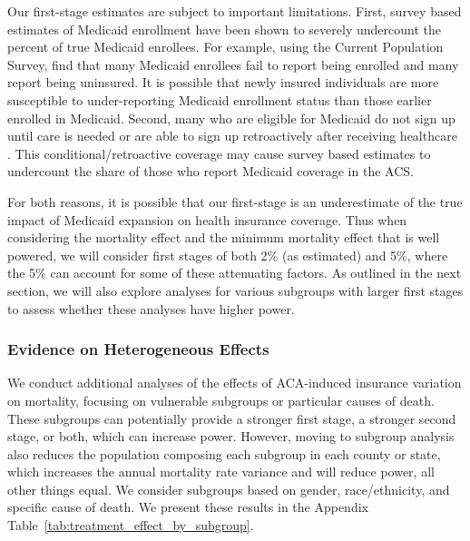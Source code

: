 \documentclass[12pt]{article}%
\begin{document}
   Our first-stage estimates are subject to important limitations. 
  First, survey based estimates of Medicaid enrollment have been shown to severely undercount the percent of true Medicaid enrollees. 
  For example, using the Current Population Survey, \citet{Davern2009MedicaidUndercountInSurveys} find that many Medicaid enrollees fail to report being enrolled and many report being  uninsured. 
  It is possible that newly insured individuals are more susceptible to under-reporting Medicaid enrollment status than those earlier enrolled in Medicaid. 
  Second, many who are eligible for Medicaid do not sign up until care is needed or are able to sign up retroactively after receiving healthcare \citep{martonHealthInsuranceGenerosity2015}. 
  This conditional/retroactive coverage may cause survey based estimates to undercount the share of those who report Medicaid coverage in the ACS. 
  
  For both reasons, it is possible that our first-stage is an underestimate of the true impact of Medicaid expansion on health insurance coverage. 
  Thus when considering the mortality effect and the minimum mortality effect that is well powered, we will consider first stages of both 2\% (as estimated) and 5\%, where the 5\% can account for some of these attenuating factors. 
  As outlined in the next section, we will also explore analyses for various subgroups with larger first stages to assess whether these analyses have higher power. 






\subsubsection{Evidence on Heterogeneous Effects}

We conduct additional analyses of the effects of ACA-induced insurance variation on mortality, focusing on vulnerable subgroups or particular causes of death.  
These subgroups can potentially provide a stronger first stage, a stronger second stage, or both, which can increase power.   
However, moving to subgroup analysis also reduces the population composing each subgroup in each county or state, which increases the annual mortality rate variance and will reduce power, all other things equal. 
We consider subgroups based on gender, race/ethnicity, and specific cause of death.  
We present these results in the Appendix Table~\ref{tab:treatment_effect_by_subgroup}.
\end{document}
